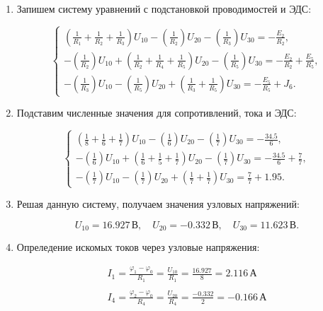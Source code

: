 \begin{enumerate}
	\item Запишем систему уравнений с подстановкой проводимостей и ЭДС:

	      \[
		      \begin{cases}
			      \left( \frac{1}{R_1} + \frac{1}{R_2} + \frac{1}{R_3} \right) U_{10} - \left( \frac{1}{R_2} \right) U_{20} - \left( \frac{1}{R_3} \right) U_{30} = -\frac{E_2}{R_2},                    \\
			      -\left( \frac{1}{R_2} \right) U_{10} + \left( \frac{1}{R_2} + \frac{1}{R_4} + \frac{1}{R_5} \right) U_{20} - \left( \frac{1}{R_5} \right) U_{30} = -\frac{E_2}{R_2} + \frac{E_5}{R_5}, \\
			      -\left( \frac{1}{R_3} \right) U_{10} - \left( \frac{1}{R_5} \right) U_{20} + \left( \frac{1}{R_3} + \frac{1}{R_5} \right) U_{30} = -\frac{E_5}{R_5} + J_6.
		      \end{cases}
	      \]

	\item Подставим численные значения для сопротивлений, тока и ЭДС:

	      \[
		      \begin{cases}
			      \left( \frac{1}{8} + \frac{1}{6} + \frac{1}{7} \right) U_{10} - \left( \frac{1}{6} \right) U_{20} - \left( \frac{1}{7} \right) U_{30} = -\frac{34.5}{6},                \\
			      -\left( \frac{1}{6} \right) U_{10} + \left( \frac{1}{6} + \frac{1}{5} + \frac{1}{7} \right) U_{20} - \left( \frac{1}{7} \right) U_{30} = -\frac{34.5}{6} + \frac{7}{7}, \\
			      -\left( \frac{1}{7} \right) U_{10} - \left( \frac{1}{7} \right) U_{20} + \left( \frac{1}{7} + \frac{1}{7} \right) U_{30} = \frac{7}{7} + 1.95.
		      \end{cases}
	      \]

	\item Решая данную систему, получаем значения узловых напряжений:

	      \[
		      U_{10} = 16.927 \, \text{В}, \quad U_{20} = -0.332 \, \text{В}, \quad U_{30} = 11.623 \, \text{В}.
	      \]

	\item Опреледение искомых токов через узловые напряжения:

	      \[
		      \begin{gathered}
			      I_1 = \frac{\varphi_1 - \varphi_0}{R_1} = \frac{U_{10}}{R_1} = \frac{16.927}{8} = 2.116 \, \text{А} \\
			      \\[-0.5em]
			      I_4 = \frac{\varphi_2-\varphi_0}{R_4} = \frac{U_{20}}{R_4} = \frac{-0.332}{2} = -0.166 \, \text{А} \\
		      \end{gathered}
	      \]


\end{enumerate}
